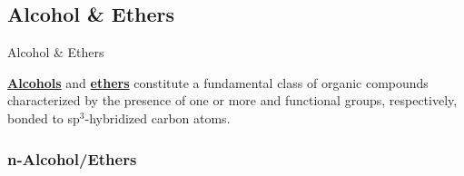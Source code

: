\documentclass[10pt]{article}
\begin{document}
  \subsection{Alcohol \& Ethers}

    \begin{core}{Alcohol \& Ethers}

      \href{https://ibahng.github.io/chemistry/alcohols/alcohols.pdf}{\textbf{Alcohols}} and \href{https://ibahng.github.io/chemistry/ethers/ethers.pdf}{\textbf{ethers}} constitute a fundamental class of organic compounds characterized by the presence of one or more  and  functional groups, respectively, bonded to sp$^3$-hybridized carbon atoms.

    \end{core}

    \subsubsection{n-Alcohol/Ethers}
\end{document}
